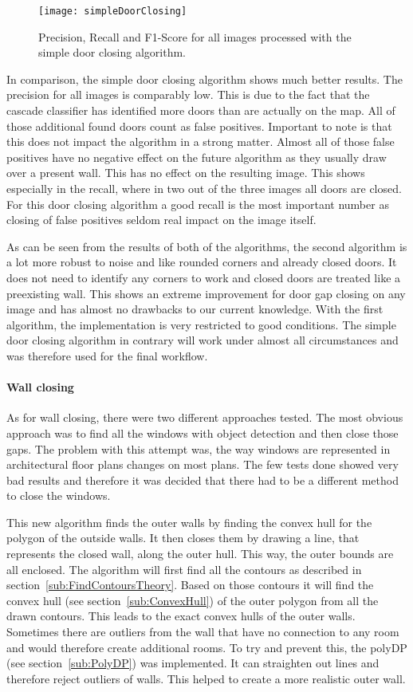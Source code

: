 \begin{figure}[H]
	\centering
	\texttt{[image: simpleDoorClosing]}
	\caption{Precision, Recall and F1-Score for all images processed with the simple door closing algorithm. }
	\label{fig:simpleDoorClosing}
\end{figure}

In comparison, the simple door closing algorithm shows much better results. The precision for all images is comparably low. This is due to the fact that the cascade classifier has identified more doors than are actually on the map. All of those additional found doors count as false positives. Important to note is that this does not impact the algorithm in a strong matter. Almost all of those false positives have no negative effect on the future algorithm as they usually draw over a present wall. This has no effect on the resulting image. This shows especially in the recall, where in two out of the three images all doors are closed.
For this door closing algorithm a good recall is the most important number as closing of false positives seldom real impact on the image itself.

As can be seen from the results of both of the algorithms, the second algorithm is a lot more robust to noise and like rounded corners and already closed doors. It does not need to identify any corners to work and closed doors are treated like a preexisting wall. This shows an extreme improvement for door gap closing on any image and has almost no drawbacks to our current knowledge. With the first algorithm, the implementation is very restricted to good conditions. The simple door closing algorithm in contrary will work under almost all circumstances and was therefore used for the final workflow.

\paragraph{Wall closing}
\label{sub:WallClosing}
As for wall closing, there were two different approaches tested. The most obvious approach was to find all the windows with object detection and then close those gaps. The problem with this attempt was, the way windows are represented in architectural floor plans changes on most plans. The few tests done showed very bad results and therefore it was decided that there had to be a different method to close the windows.

This new algorithm finds the outer walls by finding the convex hull for the polygon of the outside walls. It then closes them by drawing a line, that represents the closed wall, along the outer hull. This way, the outer bounds are all enclosed.
The algorithm will first find all the contours as described in section~\ref{sub:FindContoursTheory}. Based on those contours it will find the convex hull (see section~\ref{sub:ConvexHull}) of the outer polygon from all the drawn contours. This leads to the exact convex hulls of the outer walls. Sometimes there are outliers from the wall that have no connection to any room and would therefore create additional rooms. To try and prevent this, the polyDP (see section~\ref{sub:PolyDP}) was implemented. It can straighten out lines and therefore reject outliers of walls. This helped to create a more realistic outer wall.
